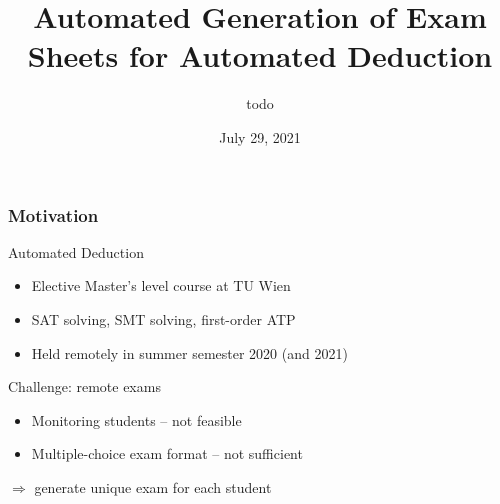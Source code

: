 \documentclass[xcolor={table}]{beamer}
\title{Automated Generation of Exam Sheets for Automated Deduction} %
\author{todo} %
\institute{
Vienna University of Technology%
}
\date{\vspace*{-3em}\small July 29, 2021} %
\begin{document}
\begin{frame}[plain]
\titlepage %
\end{frame}
\addtocounter{framenumber}{-1}



\begin{frame}
\frametitle{Motivation}

    \begin{block}{Automated Deduction}
        \begin{itemize}
            \item Elective Master's level course at TU Wien
            \item SAT solving, SMT solving, first-order ATP
            \item Held remotely in summer semester 2020 (and 2021)
        \end{itemize}
    \end{block}



    \medskip
    \pause

    \begin{alertblock}{Challenge: remote exams}
        \begin{itemize}
            \item Monitoring students -- not feasible
            \item Multiple-choice exam format -- not sufficient
        \end{itemize}
    \end{alertblock}
    \pause
    \vspace*{1em}
    \qquad $\Rightarrow$ generate unique exam for each student
\end{frame}
\end{document}
